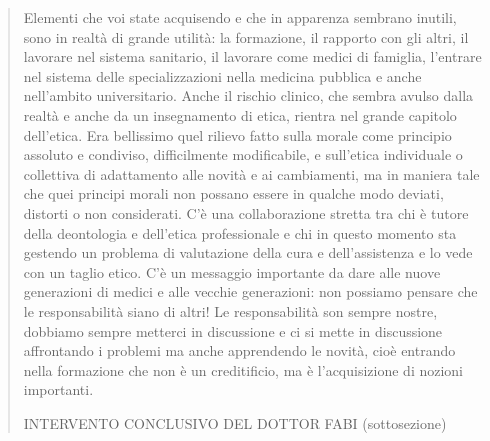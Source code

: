 \documentclass[]{article}
\begin{document}
\begin{quote}
Elementi che voi state acquisendo e che in apparenza sembrano inutili,
sono in realtà di grande utilità: la formazione, il rapporto con gli
altri, il lavorare nel sistema sanitario, il lavorare come medici di
famiglia, l'entrare nel sistema delle specializzazioni nella medicina
pubblica e anche nell'ambito universitario. Anche il rischio clinico,
che sembra avulso dalla realtà e anche da un insegnamento di etica,
rientra nel grande capitolo dell'etica. Era bellissimo quel rilievo
fatto sulla morale come principio assoluto e condiviso, difficilmente
modificabile, e sull'etica individuale o collettiva di adattamento alle
novità e ai cambiamenti, ma in maniera tale che quei principi morali non
possano essere in qualche modo deviati, distorti o non considerati. C'è
una collaborazione stretta tra chi è tutore della deontologia e
dell'etica professionale e chi in questo momento sta gestendo un
problema di valutazione della cura e dell'assistenza e lo vede con un
taglio etico. C'è un messaggio importante da dare alle nuove generazioni
di medici e alle vecchie generazioni: non possiamo pensare che le
responsabilità siano di altri! Le responsabilità son sempre nostre,
dobbiamo sempre metterci in discussione e ci si mette in discussione
affrontando i problemi ma anche apprendendo le novità, cioè entrando
nella formazione che non è un creditificio, ma è l'acquisizione di
nozioni importanti.

INTERVENTO CONCLUSIVO DEL DOTTOR FABI (sottosezione)


\end{quote}
\end{document}
